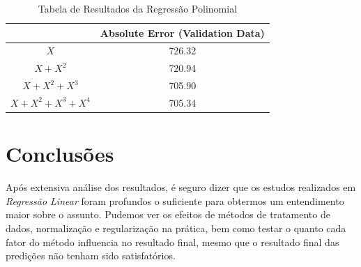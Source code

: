 \documentclass[conference]{IEEEtran}
\begin{document}
\begin{table}[H]
\centering
\begin{tabular}{|c|c|}
\hline
               								& Absolute Error (Validation Data) \\ \hline
$X$     											& 726.32                        \\ \hline
$X + X^{2}$ 									& 720.94                        \\ \hline
$X + X^{2} + X^{3}$   				& 705.90                        \\ \hline
$X + X^{2} + X^{3} + X^{4}$   & 705.34                        \\ \hline
\end{tabular}
\caption{Tabela de Resultados da Regressão Polinomial}
\label{table:results_poli}
\end{table}

\section{Conclusões}

Após extensiva análise dos resultados, é seguro dizer que os estudos realizados em \textit{Regressão Linear} foram profundos o suficiente para obtermos um entendimento maior sobre o assunto. Pudemos ver os efeitos de métodos de tratamento de dados, normalização e regularização na prática, bem como testar o quanto cada fator do método influencia no resultado final, mesmo que o resultado final das predições não tenham sido satisfatórios.



\end{document}
